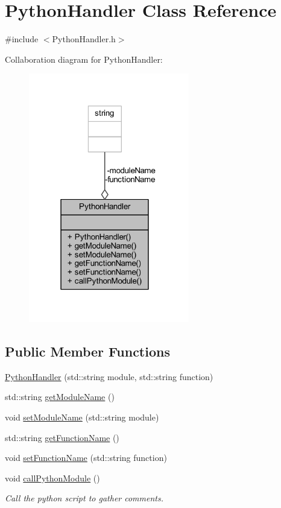 \hypertarget{class_python_handler}{}\section{Python\+Handler Class Reference}
\label{class_python_handler}


{\ttfamily \#include $<$Python\+Handler.\+h$>$}



Collaboration diagram for Python\+Handler\+:\nopagebreak
\begin{figure}[H]
\begin{center}
\leavevmode
\includegraphics[width=199pt]{class_python_handler__coll__graph}
\end{center}
\end{figure}
\subsection*{Public Member Functions}
\begin{DoxyCompactItemize}
\item 
\hyperlink{class_python_handler_ac49f0f52604ab7afb9443712bf1c2cd0}{Python\+Handler} (std\+::string module, std\+::string function)
\item 
std\+::string \hyperlink{class_python_handler_acf20183155762af98d1f8804881cddb4}{get\+Module\+Name} ()
\item 
void \hyperlink{class_python_handler_a035cda1c3987043041c7aeb8e3440f04}{set\+Module\+Name} (std\+::string module)
\item 
std\+::string \hyperlink{class_python_handler_a60186d0ff375491ad5d91c7448c29288}{get\+Function\+Name} ()
\item 
void \hyperlink{class_python_handler_a640d790693c476a5bdd87050c7416ff0}{set\+Function\+Name} (std\+::string function)
\item 
void \hyperlink{class_python_handler_ac60ae844922ca438081e1f8cc0164b45}{call\+Python\+Module} ()
\begin{DoxyCompactList}\small\item\em Call the python script to gather comments. \end{DoxyCompactList}\end{DoxyCompactItemize}
